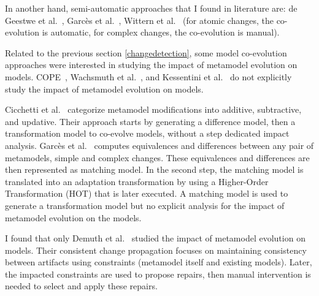 
In another hand, semi-automatic approaches that I found in literature are: de Geestwe et al.~\cite{de2008generating},  Garcès et al.~\cite{garces2014adapting}, Wittern et al.~\cite{wittern2013determining} (for atomic changes, the co-evolution is automatic, for complex changes, the co-evolution is manual).


Related to the previous section \ref{changedetection}, some model co-evolution approaches were interested in studying the impact of metamodel evolution on models.
COPE~\cite{herrmannsdoerfer2009cope}, Wachsmuth et al.~\cite{wachsmuth2007metamodel}, and Kessentini et al.~\cite{kessentini2018integrating,kessentini2020interactive} do not explicitly study the impact of metamodel evolution on  models.
 
 Cicchetti et al.~\cite{cicchetti2008automating} categorize metamodel modifications  into additive, subtractive, and updative. Their approach starts by generating a difference model, then a transformation model to co-evolve models, without a step dedicated impact analysis.
Garcès et al.~\cite{garces2009managing} computes equivalences and differences between any pair of metamodels, simple and complex changes. These equivalences and differences are then represented as matching model. In the second step, the matching model is translated into an adaptation transformation by using a Higher-Order Transformation (HOT) that is later executed. A matching model is used to generate a transformation model but no explicit analysis for the impact of metamodel evolution on the models.

I found that only Demuth et al.~\cite{demuth2016co} studied the impact of metamodel evolution on models. Their consistent change propagation focuses on maintaining consistency between artifacts using constraints (metamodel itself and existing models). Later, the impacted constraints are used to propose repairs, then manual intervention is needed to select and apply these repairs.

